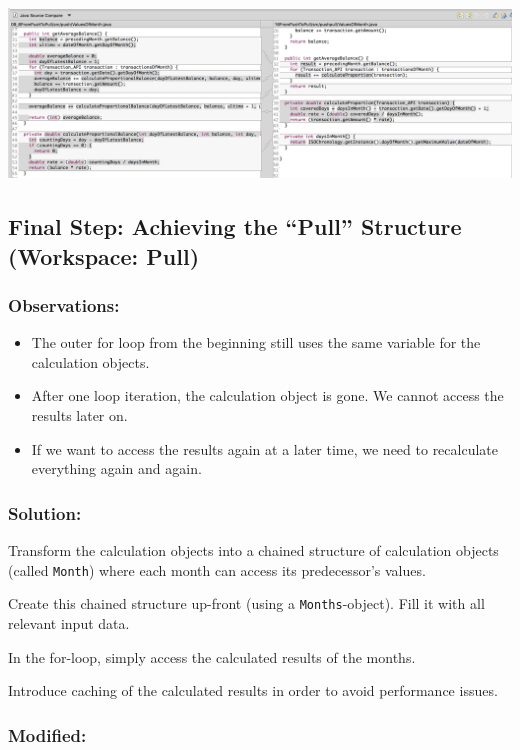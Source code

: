 \documentclass[a4paper,fleqn,titlepage,11pt]{article}
\begin{document}
\includegraphics[width=1\textwidth]{CompareViews/15-16.png}


\subsection*{Final Step: Achieving the ``Pull'' Structure (Workspace: Pull)}

\subsubsection*{Observations:}

\begin{itemize}
\item The outer for loop from the beginning still uses the same variable for the calculation objects.
\item After one loop iteration, the calculation object is gone. We cannot access the results later on.
\item If we want to access the results again at a later time, we need to recalculate everything again and again.
\end{itemize}

\subsubsection*{Solution:}

Transform the calculation objects into a chained structure of calculation objects (called \texttt{Month}) where each month can access its predecessor's values.

Create this chained structure up-front (using a \texttt{Months}-object). Fill it with all relevant input data.

In the for-loop, simply access the calculated results of the months.

Introduce caching of the calculated results in order to avoid performance issues.

\subsubsection*{Modified:}
\end{document}
